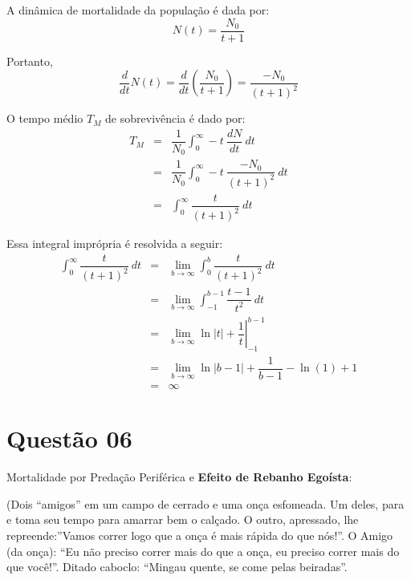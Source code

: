 {A dinâmica de mortalidade da população é dada por:
\[N(t) = \dfrac{N_0}{t+1}\]

Portanto,
\[
\dfrac{d}{dt} N(t)
= \dfrac{d}{dt}\left(\dfrac{N_0}{t+1}\right)
= \dfrac{-N_0}{(t+1)^{2}}
\]


O tempo médio \(T_M\) de sobrevivência é dado por:
\[\begin{array}{rcl}
T_M
&=&
\dfrac{1}{N_0} \displaystyle\int_{0}^{\infty} -t\ \dfrac{dN}{dt}\ dt \\[0.3cm]
&=&
\dfrac{1}{N_0} \displaystyle\int_{0}^{\infty} -t\ \dfrac{-N_0}{(t+1)^{2}}\ dt \\[0.3cm]
&=&
\displaystyle\int_{0}^{\infty}  \dfrac{t}{(t+1)^{2}}\ dt
\end{array}\]

Essa integral imprópria é resolvida a seguir:
\[\begin{array}{rcl}
\displaystyle\int_{0}^{\infty}  \dfrac{t}{(t+1)^{2}}\ dt
&=&
\displaystyle\lim_{b \to \infty} \displaystyle\int_{0}^{b}  \dfrac{t}{(t+1)^{2}}\ dt \\[0.3cm]
&=&
\displaystyle\lim_{b \to \infty} \displaystyle\int_{-1}^{b-1}  \dfrac{t-1}{t^{2}}\ dt \\[0.3cm]
&=&
\displaystyle\lim_{b \to \infty} \left.\ln|t|+\dfrac{1}{t}\right|_{-1}^{b-1} \\
&=& 
\displaystyle\lim_{b \to \infty} \ln|b-1|+\dfrac{1}{b-1}-\ln(1)+1 \\
&=& \infty
\end{array}\]

}

\section*{Questão 06}


    Mortalidade por Predação Periférica e \textbf{Efeito de Rebanho Egoísta}:
    
    \begin{citacao}
    (Dois ``amigos'' em um campo de cerrado e uma onça esfomeada. Um deles, para e toma seu tempo para amarrar bem o calçado. O outro, apressado, lhe repreende:''Vamos correr logo que a onça é mais rápida do que nós!''. O Amigo (da onça): ``Eu não preciso correr mais do que a onça, eu preciso correr mais do que você!''. Ditado caboclo: ``Mingau quente, se come pelas beiradas''.
    \end{citacao}


